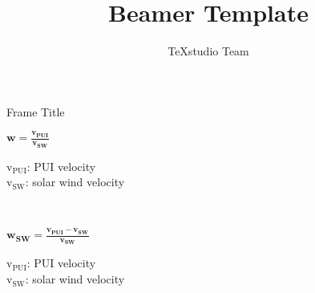 \documentclass{beamer}
\title{Beamer Template}
\author{TeXstudio Team}
\begin{document}
\begin{frame}[plain]
    \maketitle
\end{frame}
\begin{frame}{Frame Title}
\begin{minipage}{.3\textwidth}
	\begin{mdframed}[roundcorner=4pt,
		align=center,linecolor=black,backgroundcolor=mnflight,innerleftmargin = 4pt,innerrightmargin = 2pt,
		linewidth=1pt]
		{\begin{center}
				\large $\mathbf{w = \frac{v_{PUI}}{v_{SW}}}$\\[0.1cm]
		{\tiny
			
			$\text{v}_\text{{PUI}}$: PUI velocity \\
			$\text{v}_\text{{SW}}$: solar wind velocity
			
			
	}
		\end{center}}
	\end{mdframed}
\end{minipage}
\\[1cm]
\begin{minipage}{.3\textwidth}
	\begin{mdframed}[roundcorner=4pt,
		align=center,linecolor=black,backgroundcolor=mnflight,innerleftmargin = 4pt,innerrightmargin = 2pt,
		linewidth=1pt]
		{\begin{center}
				\large $\mathbf{w_{SW} = \frac{v_{PUI}-v_{SW}}{v_{SW}}}$\\[0.1cm]
				{\tiny
					
					$\text{v}_\text{{PUI}}$: PUI velocity \\
					$\text{v}_\text{{SW}}$: solar wind velocity
					
					
				}
		\end{center}}
	\end{mdframed}
\end{minipage}


\end{frame}
\end{document}
